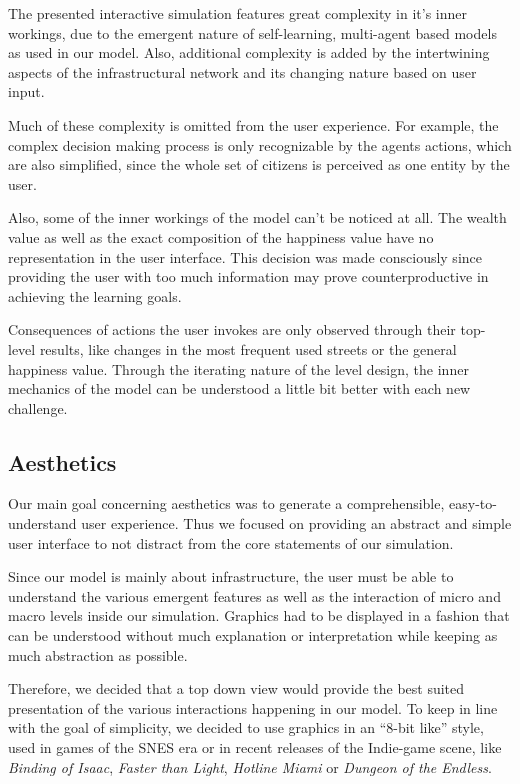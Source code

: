 \documentclass[table]{sig-alternate-05-2015}
\begin{document}
The presented interactive simulation features great complexity in it's inner workings, due to the emergent nature of self-learning, multi-agent based models as used in our model. Also, additional complexity is added by the intertwining aspects of the infrastructural network and its changing nature based on user input.

Much of these complexity is omitted from the user experience. For example, the complex decision making process is only recognizable by the agents actions, which are also simplified, since the whole set of citizens is perceived as one entity by the user.

Also, some of the inner workings of the model can't be noticed at all. The wealth value as well as the exact composition of the happiness value have no representation in the user interface. This decision was made consciously since providing the user with too much information may prove counterproductive in achieving the learning goals.

Consequences of actions the user invokes are only observed through their top-level results, like changes in the most frequent used streets or the general happiness value. Through the iterating nature of the level design, the inner mechanics of the model can be understood a little bit better with each new challenge.

\subsection{Aesthetics}

Our main goal concerning aesthetics was to generate a comprehensible, easy-to-understand user experience. Thus we focused on providing an abstract and simple user interface to not distract from the core statements of our simulation.

Since our model is mainly about infrastructure, the user must be able to understand the various emergent features as well as the interaction of micro and macro levels inside our simulation. Graphics had to be displayed in a fashion that can be understood without much explanation or interpretation while keeping as much abstraction as possible.

Therefore, we decided that a top down view would provide the best suited presentation of the various interactions happening in our model. To keep in line with the goal of simplicity, we decided to use graphics in an ``8-bit like'' style, used in games of the SNES era or in recent releases of the Indie-game scene, like \textit{Binding of Isaac}, \textit{Faster than Light}, \textit{Hotline Miami} or \textit{Dungeon of the Endless}.
 
\end{document}
